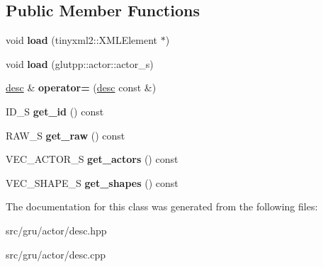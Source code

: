 \subsection*{\-Public \-Member \-Functions}
\begin{DoxyCompactItemize}
\item 
\hypertarget{classglutpp_1_1actor_1_1desc_a22dd802ffc09896f15f29c651d5d0583}{void {\bfseries load} (tinyxml2\-::\-X\-M\-L\-Element $\ast$)}\label{classglutpp_1_1actor_1_1desc_a22dd802ffc09896f15f29c651d5d0583}

\item 
\hypertarget{classglutpp_1_1actor_1_1desc_af1a3e759f86cb19639093036889397e6}{void {\bfseries load} (glutpp\-::actor\-::actor\-\_\-s)}\label{classglutpp_1_1actor_1_1desc_af1a3e759f86cb19639093036889397e6}

\item 
\hypertarget{classglutpp_1_1actor_1_1desc_aec64f60a2aa08873c91b60189bec69e4}{\hyperlink{classglutpp_1_1actor_1_1desc}{desc} \& {\bfseries operator=} (\hyperlink{classglutpp_1_1actor_1_1desc}{desc} const \&)}\label{classglutpp_1_1actor_1_1desc_aec64f60a2aa08873c91b60189bec69e4}

\item 
\hypertarget{classglutpp_1_1actor_1_1desc_a4c7f3b20822d1ac3880a8cad406f9247}{\-I\-D\-\_\-\-S {\bfseries get\-\_\-id} () const }\label{classglutpp_1_1actor_1_1desc_a4c7f3b20822d1ac3880a8cad406f9247}

\item 
\hypertarget{classglutpp_1_1actor_1_1desc_a143246b129432636d4b87b400ce7223d}{\-R\-A\-W\-\_\-\-S {\bfseries get\-\_\-raw} () const }\label{classglutpp_1_1actor_1_1desc_a143246b129432636d4b87b400ce7223d}

\item 
\hypertarget{classglutpp_1_1actor_1_1desc_abfe7c46ff2d108133ca0944e6aaae0f8}{\-V\-E\-C\-\_\-\-A\-C\-T\-O\-R\-\_\-\-S {\bfseries get\-\_\-actors} () const }\label{classglutpp_1_1actor_1_1desc_abfe7c46ff2d108133ca0944e6aaae0f8}

\item 
\hypertarget{classglutpp_1_1actor_1_1desc_af697cb71b8946af2c441f777d508ef73}{\-V\-E\-C\-\_\-\-S\-H\-A\-P\-E\-\_\-\-S {\bfseries get\-\_\-shapes} () const }\label{classglutpp_1_1actor_1_1desc_af697cb71b8946af2c441f777d508ef73}

\end{DoxyCompactItemize}


\-The documentation for this class was generated from the following files\-:\begin{DoxyCompactItemize}
\item 
src/gru/actor/desc.\-hpp\item 
src/gru/actor/desc.\-cpp\end{DoxyCompactItemize}
